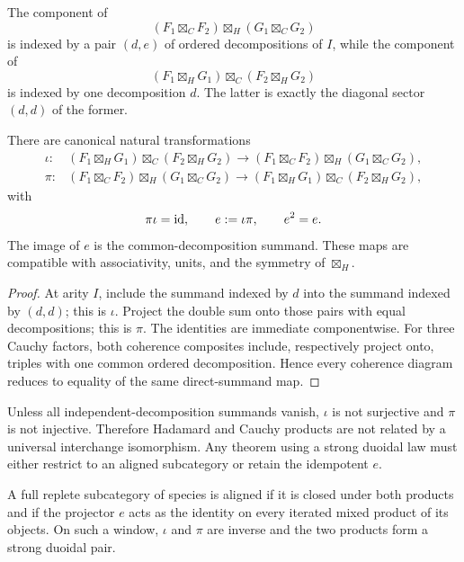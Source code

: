 The component of
\[
 (F_1\boxtimes_CF_2)\boxtimes_H(G_1\boxtimes_CG_2)
\]
is indexed by a pair \((d,e)\) of ordered decompositions of \(I\), while the component of
\[
 (F_1\boxtimes_HG_1)\boxtimes_C(F_2\boxtimes_HG_2)
\]
is indexed by one decomposition \(d\).  The latter is exactly the diagonal sector \((d,d)\) of the former.

\begin{theorem}\label{thm:aligned-splitting}
There are canonical natural transformations
\begin{align*}
 \iota:
 &(F_1\boxtimes_HG_1)\boxtimes_C(F_2\boxtimes_HG_2)
 \longrightarrow
 (F_1\boxtimes_CF_2)\boxtimes_H(G_1\boxtimes_CG_2),\\
 \pi:
 &(F_1\boxtimes_CF_2)\boxtimes_H(G_1\boxtimes_CG_2)
 \longrightarrow
 (F_1\boxtimes_HG_1)\boxtimes_C(F_2\boxtimes_HG_2),
\end{align*}
with
\[
 \pi\iota=\operatorname{id},
 \qquad e:=\iota\pi,
 \qquad e^2=e.
\]
The image of \(e\) is the common-decomposition summand.  These maps are compatible with associativity, units, and the symmetry of \(\boxtimes_H\).
\end{theorem}
\begin{proof}
At arity \(I\), include the summand indexed by \(d\) into the summand indexed by \((d,d)\); this is \(\iota\).  Project the double sum onto those pairs with equal decompositions; this is \(\pi\).  The identities are immediate componentwise.  For three Cauchy factors, both coherence composites include, respectively project onto, triples with one common ordered decomposition.  Hence every coherence diagram reduces to equality of the same direct-summand map.
\end{proof}

\begin{nogobox}[title={No-go theorem 3: no global strong-duoidal isomorphism}]
Unless all independent-decomposition summands vanish, \(\iota\) is not surjective and \(\pi\) is not injective.  Therefore Hadamard and Cauchy products are not related by a universal interchange isomorphism.  Any theorem using a strong duoidal law must either restrict to an aligned subcategory or retain the idempotent \(e\).
\end{nogobox}

\begin{definition}\label{def:aligned-window}
A full replete subcategory of species is aligned if it is closed under both products and if the projector \(e\) acts as the identity on every iterated mixed product of its objects.  On such a window, \(\iota\) and \(\pi\) are inverse and the two products form a strong duoidal pair.
\end{definition}

